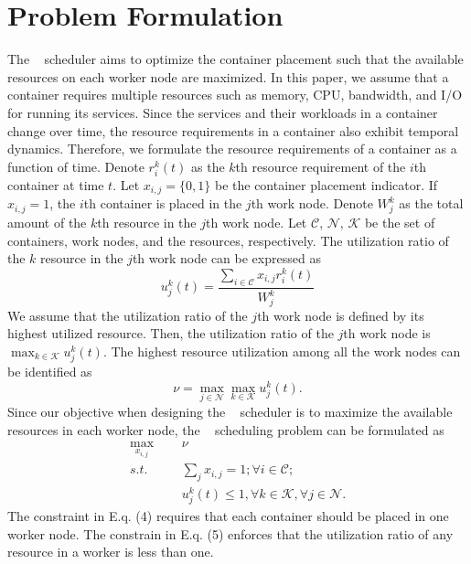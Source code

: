 \section{Problem Formulation}
The \sol~ scheduler aims to optimize the container placement such that the available
resources on each worker node are maximized. In this paper, we assume that a container requires multiple resources such as memory, CPU, bandwidth, and I/O for running its services. Since the services and their workloads in a container change over time, the resource requirements in a container also exhibit temporal
dynamics. Therefore, we formulate the resource requirements of a container as a function of time.
Denote $r_i^{k}(t)$ as the $k$th resource requirement of the $i$th container at time $t$. Let $x_{i,j}=\{0, 1\}$ be the container placement indicator.
If $x_{i,j}=1$, the $i$th container is placed in the $j$th work node. Denote $W_j^k$ as the total amount of the $k$th
resource in the $j$th work node. Let $\mathcal{C}$, $\mathcal{N}$, $\mathcal{K}$ be the set of containers, work nodes,
and the resources, respectively. The utilization ratio of the $k$ resource in the $j$th work node can be expressed as
\begin{equation}\label{eq:work_util_ratio}
  u^k_j(t)=\frac{\sum_{i\in\mathcal{C}}x_{i,j}r_i^{k}(t)}{W_j^k}
\end{equation}
We assume that the utilization ratio of the $j$th work node is defined by its highest utilized resource. 
Then, the utilization ratio of the $j$th work node is $\max_{k\in\mathcal{K}}u^k_j(t)$.
The highest resource utilization among all the work nodes can be identified as
\begin{equation}\label{eq:util_worker}
  \nu=\max_{j\in\mathcal{N}}\max_{k\in\mathcal{K}}u^k_j(t).
\end{equation}
Since our objective when designing the \sol~ scheduler is to maximize the available
resources in each worker node, the \sol~ scheduling problem can be formulated as
\begin{align}\label{eq:sched_problem}
  \max_{x_{i,j}} &\;\;\;\;\; \nu \\
  s.t. &\;\;\;\;\; \sum_j x_{i,j}=1;\forall i\in\mathcal{C};\\
       &\;\;\;\;\; u^k_j(t)\leq 1, \forall k\in\mathcal{K}, \forall j\in\mathcal{N}.
\end{align}
The constraint in E.q. (4) requires that each container should be placed in
one worker node. The constrain in E.q. (5) enforces that the utilization ratio of any resource in a worker is less than one.
